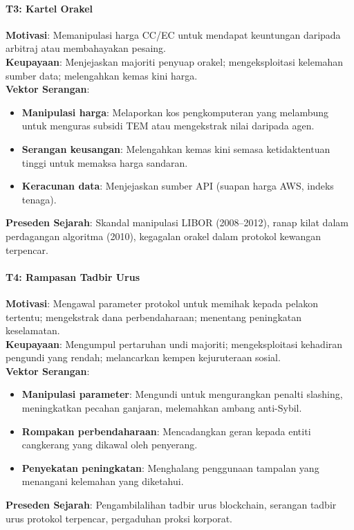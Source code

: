 \documentclass[11pt]{article}
\begin{document}
\paragraph{T3: Kartel Orakel}
\textbf{Motivasi}: Memanipulasi harga CC/EC untuk mendapat keuntungan daripada arbitraj atau membahayakan pesaing.\\
\textbf{Keupayaan}: Menjejaskan majoriti penyuap orakel; mengeksploitasi kelemahan sumber data; melengahkan kemas kini harga.\\
\textbf{Vektor Serangan}:
\begin{itemize}[noitemsep]
  \item \textbf{Manipulasi harga}: Melaporkan kos pengkomputeran yang melambung untuk menguras subsidi TEM atau mengekstrak nilai daripada agen.
  \item \textbf{Serangan keusangan}: Melengahkan kemas kini semasa ketidaktentuan tinggi untuk memaksa harga sandaran.
  \item \textbf{Keracunan data}: Menjejaskan sumber API (suapan harga AWS, indeks tenaga).
\end{itemize}
\textbf{Preseden Sejarah}: Skandal manipulasi LIBOR (2008--2012), ranap kilat dalam perdagangan algoritma (2010), kegagalan orakel dalam protokol kewangan terpencar.

\paragraph{T4: Rampasan Tadbir Urus}
\textbf{Motivasi}: Mengawal parameter protokol untuk memihak kepada pelakon tertentu; mengekstrak dana perbendaharaan; menentang peningkatan keselamatan.\\
\textbf{Keupayaan}: Mengumpul pertaruhan undi majoriti; mengeksploitasi kehadiran pengundi yang rendah; melancarkan kempen kejuruteraan sosial.\\
\textbf{Vektor Serangan}:
\begin{itemize}[noitemsep]
  \item \textbf{Manipulasi parameter}: Mengundi untuk mengurangkan penalti slashing, meningkatkan pecahan ganjaran, melemahkan ambang anti-Sybil.
  \item \textbf{Rompakan perbendaharaan}: Mencadangkan geran kepada entiti cangkerang yang dikawal oleh penyerang.
  \item \textbf{Penyekatan peningkatan}: Menghalang penggunaan tampalan yang menangani kelemahan yang diketahui.
\end{itemize}
\textbf{Preseden Sejarah}: Pengambilalihan tadbir urus blockchain, serangan tadbir urus protokol terpencar, pergaduhan proksi korporat.
\end{document}
